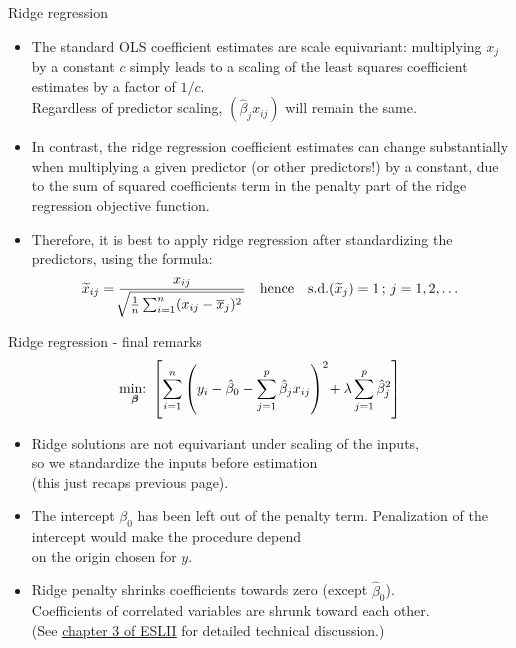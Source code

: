 \documentclass{beamer}
\begin{document}
\begin{frame}{Ridge regression}
\begin{itemize}
\item The standard OLS coefficient estimates are scale equivariant: multiplying $x_j$ by a constant $c$ simply leads to a scaling of the least squares coefficient estimates by a factor of $1/c$.\\ 
\medskip Regardless of predictor scaling, $ ( \hat{\beta}_j x_{ij} )$ will remain the same.
\medskip
\item In contrast, the ridge regression coefficient estimates can change substantially when multiplying a given predictor (or other predictors!) by a constant, due to the sum of squared coefficients term in the penalty part of the ridge regression objective function.
\medskip
\item Therefore, it is best to apply ridge regression after standardizing the predictors, using the formula:
$$ \widetilde{x}_{ij} = \frac{x_{ij}}{
   \sqrt[]{\frac{1}{n} \sum_{i=1}^n (x_{ij} - \overline{x}_j)^2 \,}}
   \quad \textnormal{hence} \quad
   \textnormal{s.d.}(\widetilde{x}_{j}) = 1\, ; \, j=1,2,\dots$$
 
\end{itemize}
\end{frame}
\begin{frame}{Ridge regression - final remarks}
$$\underset{\bm{\beta}}{\textnormal{min:~}} 
\left[ \sum_{i=1}^n \left(y_i - \hat{\beta}_0 
- \sum_{j=1}^p  \hat{\beta}_j x_{ij} \right)^2 
\! + \lambda \sum_{j=1}^p  \hat{\beta}_j^2 \right]
$$
\begin{itemize}
\item Ridge solutions are not equivariant under scaling of the inputs, 
\\so we standardize the inputs before estimation \\(this just recaps previous page).
\medskip
\item The intercept $\beta_0$ has been left out of the penalty term. Penalization of the intercept would make the procedure depend \\on the origin chosen for $y$.
\medskip
\item Ridge penalty shrinks coefficients towards zero (except $\hat{\beta}_0$). \\Coefficients of correlated variables are shrunk toward each other. \\ (See 
\textcolor{blue}{\underline{\href{https://web.stanford.edu/~hastie/ElemStatLearn/}{chapter 3 of ESLII}}} for detailed technical discussion.)
\end{itemize}
\end{frame}
\end{document}
